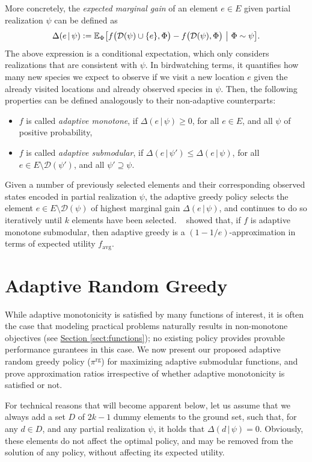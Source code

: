 \documentclass{article}
\newcommand{\sectref}[1]{\hyperref[#1]{Section \ref*{#1}}}
\newcommand{\defeq}{\vcentcolon=}
\newcommand{\mmid}{\,\vert\,}
\newcommand{\D}[2]{\Delta(#1\mmid#2)}
\newcommand{\pig}{\pi^{\textrm{rg}}}
\newcommand{\favg}{f_{\mathrm{avg}}}
\newcommand{\dom}{\mathcal{D}}
\newcommand{\citet}[1]{\citeauthor{#1}~\shortcite{#1}}
\begin{document}
More concretely, the \emph{expected marginal gain} of an element $e \in E$ given partial realization $\psi$ can be defined as
{\small
\begin{align*}
  \D{e}{\psi} \defeq \E[\Phi]{f\big(\mathcal{D}(\psi) \cup \{e\}, \Phi\big) - f\big(\dom(\psi), \Phi\big)}[\Phi \sim \psi].
\end{align*}
}
The above expression is a conditional expectation, which only considers realizations that are consistent with $\psi$.
In birdwatching terms, it quantifies how many new species we expect to observe if we visit a new location $e$ given the already visited locations and already observed species in $\psi$.
Then, the following properties can be defined analogously to their non-adaptive counterparts:
\begin{itemize}
\item $f$ is called \emph{adaptive monotone}, if $\D{e}{\psi} \geq 0$, for all $e \in E$, and all $\psi$ of positive probability,
\item $f$ is called \emph{adaptive submodular}, if $\D{e}{\psi'} \leq \D{e}{\psi}$, for all $e \in E \setminus \dom(\psi')$, and all $\psi' \supseteq \psi$.
\end{itemize}

Given a number of previously selected elements and their corresponding observed states encoded in partial realization $\psi$, the adaptive greedy policy selects the element $e \in E \setminus \dom(\psi)$ of highest marginal gain $\D{e}{\psi}$, and continues to do so iteratively until $k$ elements have been selected.
\citet{golovin11} showed that, if $f$ is adaptive monotone submodular, then adaptive greedy is a $(1-1/e)$-approximation in terms of expected utility $\favg$.

\section{Adaptive Random Greedy}
While adaptive monotonicity is satisfied by many functions of interest, it is often the case that modeling practical problems naturally results in non-monotone objectives (see \sectref{sect:functions}); no existing policy provides provable performance gurantees in this case.
We now present our proposed adaptive random greedy policy ($\pig$) for maximizing adaptive submodular functions, and prove approximation ratios irrespective of whether adaptive monotonicity is satisfied or not.

For technical reasons that will become apparent below, let us assume that we always add a set $D$ of $2k - 1$ dummy elements to the ground set, such that, for any $d \in D$, and any partial realization $\psi$, it holds that $\D{d}{\psi} = 0$.
Obviously, these elements do not affect the optimal policy, and may be removed from the solution of any policy, without affecting its expected utility.
\end{document}
